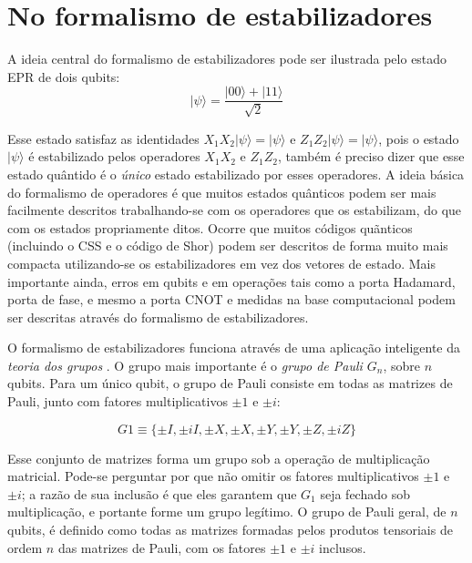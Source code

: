 \documentclass[tcc,capa]{texufpel}
\begin{document}
\section{No formalismo de estabilizadores}
A ideia central do formalismo de estabilizadores pode ser ilustrada pelo estado EPR de dois qubits:
\begin{equation}
    |\psi\rangle=\frac{|00\rangle+|11\rangle}{\sqrt{2}}
\end{equation}

Esse estado satisfaz as identidades $X_1 X_2|\psi\rangle = |\psi\rangle$ e $Z_1Z_2|\psi\rangle = |\psi\rangle$, pois o estado $|\psi\rangle$ é estabilizado pelos operadores $X_1 X_2$ e $Z_1Z_2$, também é preciso dizer que esse estado quântido é o \textit{único} estado estabilizado por esses operadores. A ideia básica do formalismo de operadores é que muitos estados quânticos podem ser mais facilmente descritos trabalhando-se com os operadores que os estabilizam, do que com os estados propriamente ditos. Ocorre que muitos códigos quãnticos (incluindo o CSS e o código de Shor) podem ser descritos de forma muito mais compacta utilizando-se os estabilizadores em vez dos vetores de estado. Mais importante ainda, erros em qubits e em operações tais como a porta Hadamard, porta de fase, e mesmo a porta CNOT e medidas na base computacional podem ser descritas através do formalismo de estabilizadores.

O formalismo de estabilizadores funciona através de uma aplicação inteligente da \textit{teoria dos grupos} \cite{olson1999logica}.  O grupo mais importante é o \textit{grupo de Pauli $G_n$}, sobre $n$ qubits. Para um único qubit, o grupo de Pauli consiste em todas as matrizes de Pauli, junto com fatores multiplicativos $\pm1$ e $\pm i$:

\begin{equation}
    G1 \equiv \{ \pm I, \pm iI, \pm X, \pm X, \pm Y, \pm Y, \pm Z, \pm iZ \}
\end{equation}

Esse conjunto de matrizes forma um grupo sob a operação de multiplicação matricial. Pode-se perguntar por que não omitir os fatores multiplicativos $\pm 1$ e $\pm i$; a razão de sua inclusão é que eles garantem que $G_1$ seja fechado sob multiplicação, e portante forme um grupo legítimo. O grupo de Pauli geral, de $n$ qubits, é definido como todas as matrizes formadas pelos produtos tensoriais de ordem $n$ das matrizes de Pauli, com os fatores $\pm 1$ e $\pm i$ inclusos. 
\end{document}
